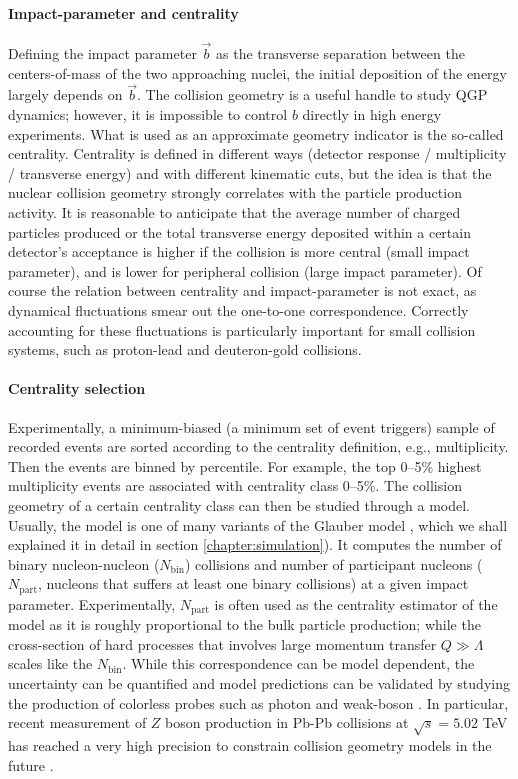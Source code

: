 \paragraph{Impact-parameter and centrality} Defining the impact parameter $\vec{b}$ as the transverse separation between the centers-of-mass of the two approaching nuclei, the initial deposition of the energy largely depends on $\vec{b}$.
The collision geometry is a useful handle to study QGP dynamics; however,
it is impossible to control $b$ directly in high energy experiments.
What is used as an approximate geometry indicator is the so-called centrality.
Centrality is defined in different ways (detector response / multiplicity / transverse energy) and with different kinematic cuts, but the idea is that the nuclear collision geometry strongly correlates with the particle production activity.
It is reasonable to anticipate that the average number of charged particles produced or the total transverse energy deposited within a certain detector's acceptance is higher if the collision is more central (small impact parameter), and is lower for peripheral collision (large impact parameter).
Of course the relation between centrality and impact-parameter is not exact, as dynamical fluctuations smear out the one-to-one correspondence.
Correctly accounting for these fluctuations is particularly important for small collision systems, such as proton-lead and deuteron-gold collisions.

\paragraph{Centrality selection} Experimentally, a minimum-biased (a minimum set of event triggers) sample of recorded events are sorted according to the centrality definition, e.g., multiplicity. 
Then the events are binned by percentile.
For example, the top 0--5\% highest multiplicity events are associated with centrality class 0--5\%. 
The collision geometry of a certain centrality class can then be studied through a model.
Usually, the model is one of many variants of the Glauber model \cite{Miller:2007ri}, which we shall explained it in detail in section \ref{chapter:simulation}).
It computes the number of binary nucleon-nucleon ($N_{\textrm{bin}}$) collisions and number of participant nucleons ($N_{\textrm{part}}$, nucleons that suffers at least one binary collisions) at a given impact parameter.
Experimentally, $N_{\textrm{part}}$ is often used as the centrality estimator of the model as it is roughly proportional to the bulk particle production; while the cross-section of hard processes that involves large momentum transfer $Q \gg \Lambda$ scales like the $N_{\textrm{bin}}$.
While this correspondence can be model dependent, the uncertainty can be quantified and model predictions can be validated by studying the production of colorless probes such as photon and weak-boson \cite{Afanasiev:2012dg,Chatrchyan:2011ua,Aad:2012ew,Aad:2015lcb,Adam:2015lda}.
In particular, recent measurement of $Z$ boson production in Pb-Pb collisions at $\sqrt{s}=5.02$ TeV has reached a very high precision to constrain collision geometry models in the future \cite{ATLAS:2017zkv}.

